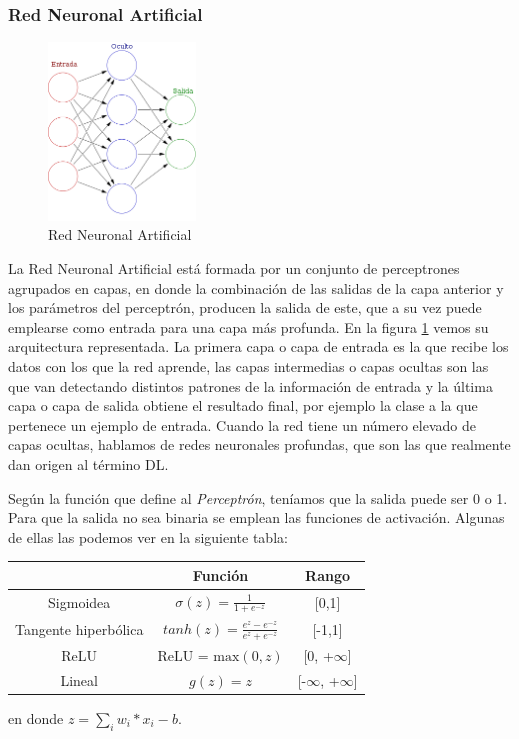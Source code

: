 \subsubsection{Red Neuronal Artificial}
\begin{figure}[H]
    \centering
    \includegraphics[width=0.35\textwidth]{Imagenes/GeoAI/red-neuronal.png}
    \caption{Red Neuronal Artificial} \label{fig:red-neuronal}
\end{figure}

La Red Neuronal Artificial está formada por un conjunto de perceptrones agrupados en capas, en donde la combinación de las salidas de la capa anterior y los parámetros del perceptrón,
producen la salida de este, que a su vez puede emplearse como entrada para una capa más profunda. En la figura \ref{fig:red-neuronal} vemos su arquitectura representada.
La primera capa o capa de entrada es la que recibe los datos con los que la red aprende, 
las capas intermedias o capas ocultas son las que van detectando distintos patrones de la información de entrada y
la última capa o capa de salida obtiene el resultado final, por ejemplo la clase a la que pertenece un ejemplo de entrada.
Cuando la red tiene un número elevado de capas ocultas, hablamos de redes neuronales profundas, que son las que realmente dan origen al término DL.

Según la función que define al \textit{Perceptrón}, teníamos que la salida puede ser 0 o 1. Para que la salida no sea binaria se emplean las funciones de activación.
Algunas de ellas las podemos ver en la siguiente tabla:
\begin{table}[H]
    \centering
    \begin{tabular}{|c|c|c|}
    \hline
                         & Función                                      & Rango                  \\
    \hline
    Sigmoidea            & $\sigma(z) = \frac{1}{1 + e^{-z}}$            & [0,1]                 \\
    \hline
    Tangente hiperbólica & $tanh(z) = \frac{e^z - e^{-z}}{e^z + e^{-z}}$ & [-1,1]                 \\
    \hline
    ReLU                 & $\text{ReLU = max} (0, z)$                    & [0, +$\infty$]          \\
    \hline
    Lineal               & $g(z) = z$                                    & [-$\infty$, +$\infty$]  \\
    \hline
    \end{tabular}
\end{table}
en donde $z = \displaystyle \sum_{i} w_i * x_i - b$.\\

